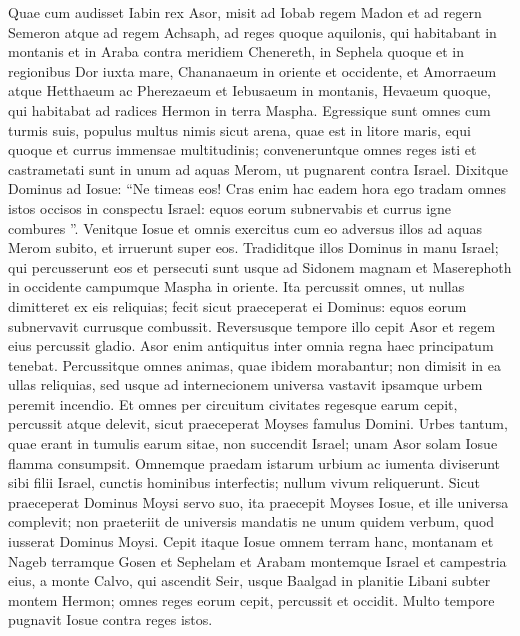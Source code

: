 \begin{biblechapter}
\begin{biblechapter}
\begin{biblechapter}
\begin{biblechapter}
\begin{biblechapter}
\begin{biblechapter}
\begin{biblechapter}
\begin{biblechapter}
\begin{biblechapter}
\begin{biblechapter}
\begin{biblechapter}
\verse Quae cum audisset Iabin rex Asor, misit ad Iobab regem Madon et ad regern Semeron atque ad regem Achsaph, 
\verse ad reges quoque aquilonis, qui habitabant in montanis et in Araba contra meridiem Chenereth, in Sephela quoque et in regionibus Dor iuxta mare, 
\verse Chananaeum in oriente et occidente, et Amorraeum atque Hetthaeum ac Pherezaeum et Iebusaeum in montanis, Hevaeum quoque, qui habitabat ad radices Hermon in terra Maspha. 
\verse Egressique sunt omnes cum turmis suis, populus multus nimis sicut arena, quae est in litore maris, equi quoque et currus immensae multitudinis; 
\verse conveneruntque omnes reges isti et castrametati sunt in unum ad aquas Merom, ut pugnarent contra Israel.
 \verse Dixitque Dominus ad Iosue: “Ne timeas eos! Cras enim hac eadem hora ego tradam omnes istos occisos in conspectu Israel: equos eorum subnervabis et currus igne combures ”. 
\verse Venitque Iosue et omnis exercitus cum eo adversus illos ad aquas Merom subito, et irruerunt super eos. 
\verse Tradiditque illos Dominus in manu Israel; qui percusserunt eos et persecuti sunt usque ad Sidonem magnam et Maserephoth in occidente campumque Maspha in oriente. Ita percussit omnes, ut nullas dimitteret ex eis reliquias; 
\verse fecit sicut praeceperat ei Dominus: equos eorum subnervavit currusque combussit.
 \verse Reversusque tempore illo cepit Asor et regem eius percussit gladio. Asor enim antiquitus inter omnia regna haec principatum tenebat. 
\verse Percussitque omnes animas, quae ibidem morabantur; non dimisit in ea ullas reliquias, sed usque ad internecionem universa vastavit ipsamque urbem peremit incendio. 
\verse Et omnes per circuitum civitates regesque earum cepit, percussit atque delevit, sicut praeceperat Moyses famulus Domini. 
\verse Urbes tantum, quae erant in tumulis earum sitae, non succendit Israel; unam Asor solam Iosue flamma consumpsit. 
 \verse Omnemque praedam istarum urbium ac iumenta diviserunt sibi filii Israel, cunctis hominibus interfectis; nullum vivum reliquerunt. 
\verse Sicut praeceperat Dominus Moysi servo suo, ita praecepit Moyses Iosue, et ille universa complevit; non praeteriit de universis mandatis ne unum quidem verbum, quod iusserat Dominus Moysi.
 \verse Cepit itaque Iosue omnem terram hanc, montanam et Nageb terramque Gosen et Sephelam et Arabam montemque Israel et campestria eius, 
\verse a monte Calvo, qui ascendit Seir, usque Baalgad in planitie Libani subter montem Hermon; omnes reges eorum cepit, percussit et occidit. 
\verse Multo tempore pugnavit Iosue contra reges istos. 

\end{biblechapter}
\end{biblechapter}
\end{biblechapter}
\end{biblechapter}
\end{biblechapter}
\end{biblechapter}
\end{biblechapter}
\end{biblechapter}
\end{biblechapter}
\end{biblechapter}
\end{biblechapter}
